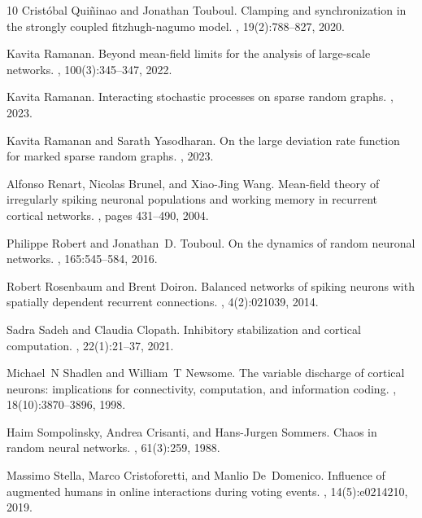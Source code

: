 \documentclass[onefignum,onetabnum]{siamart190516}
\newcommand{\1}{\mathbbm{1}}
\begin{document}
\begin{thebibliography}{10}
Crist{\'o}bal Qui{\~n}inao and Jonathan Touboul.
\newblock Clamping and synchronization in the strongly coupled fitzhugh-nagumo
  model.
, 19(2):788--827,
  2020.

Kavita Ramanan.
\newblock Beyond mean-field limits for the analysis of large-scale networks.
, 100(3):345--347, 2022.

Kavita Ramanan.
\newblock Interacting stochastic processes on sparse random graphs.
, 2023.

Kavita Ramanan and Sarath Yasodharan.
\newblock On the large deviation rate function for marked sparse random graphs.
, 2023.

Alfonso Renart, Nicolas Brunel, and Xiao-Jing Wang.
\newblock Mean-field theory of irregularly spiking neuronal populations and
  working memory in recurrent cortical networks.
, pages
  431--490, 2004.

Philippe Robert and Jonathan~D. Touboul.
\newblock On the dynamics of random neuronal networks.
, 165:545--584, 2016.

Robert Rosenbaum and Brent Doiron.
\newblock Balanced networks of spiking neurons with spatially dependent
  recurrent connections.
, 4(2):021039, 2014.

Sadra Sadeh and Claudia Clopath.
\newblock Inhibitory stabilization and cortical computation.
, 22(1):21--37, 2021.

Michael~N Shadlen and William~T Newsome.
\newblock The variable discharge of cortical neurons: implications for
  connectivity, computation, and information coding.
, 18(10):3870--3896, 1998.

Haim Sompolinsky, Andrea Crisanti, and Hans-Jurgen Sommers.
\newblock Chaos in random neural networks.
, 61(3):259, 1988.

Massimo Stella, Marco Cristoforetti, and Manlio De~Domenico.
\newblock Influence of augmented humans in online interactions during voting
  events.
, 14(5):e0214210, 2019.


\end{thebibliography}
\end{document}
